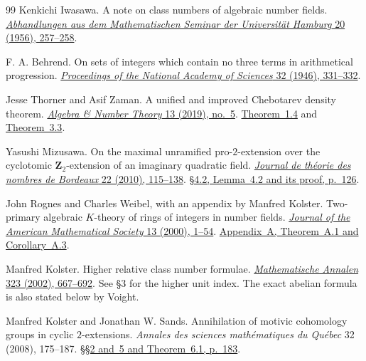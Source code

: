 \begin{thebibliography}{99}
Kenkichi Iwasawa.
A note on class numbers of algebraic number fields.
\href{https://link.springer.com/article/10.1007/BF03374563}
{\emph{Abhandlungen aus dem Mathematischen Seminar der Universit\"at
Hamburg} 20 (1956), 257--258}.

F. A. Behrend.
On sets of integers which contain no three terms in arithmetical progression.
\href{https://doi.org/10.1073/pnas.32.12.331}
{\emph{Proceedings of the National Academy of Sciences} 32 (1946), 331--332}.

Jesse Thorner and Asif Zaman.
A unified and improved Chebotarev density theorem.
\href{https://doi.org/10.2140/ant.2019.13.1039}
{\emph{Algebra \& Number Theory} 13 (2019), no.~5}.
\href{https://msp.org/ant/2019/13-5/ant-v13-n5-p02-s.pdf\#page=5}
{Theorem~1.4} and
\href{https://msp.org/ant/2019/13-5/ant-v13-n5-p02-s.pdf\#page=15}
{Theorem~3.3}.

Yasushi Mizusawa.
On the maximal unramified pro-\(2\)-extension over the cyclotomic
\(\mathbf Z_2\)-extension of an imaginary quadratic field.
\href{https://doi.org/10.5802/jtnb.707}{\emph{Journal de th\'eorie des nombres de Bordeaux}
22 (2010), 115--138}.
\href{https://www.numdam.org/item/JTNB_2010__22_1_115_0.pdf\#page=13}
{\S4.2, Lemma~4.2 and its proof, p.~126}.

John Rognes and Charles Weibel, with an appendix by Manfred Kolster.
Two-primary algebraic \(K\)-theory of rings of integers in number fields.
\href{https://doi.org/10.1090/S0894-0347-99-00317-3}
{\emph{Journal of the American Mathematical Society} 13 (2000), 1--54}.
\href{https://sites.math.rutgers.edu/~weibel/archive/papers-dir/RognesWeibel.pdf\#page=45}
{Appendix~A, Theorem~A.1 and Corollary~A.3}.

Manfred Kolster. Higher relative class number formulae.
\href{https://doi.org/10.1007/s002080200321}
{\emph{Mathematische Annalen} 323 (2002), 667--692}.
See \S3 for the higher unit index. The exact abelian formula is also stated below by Voight.

Manfred Kolster and Jonathan W. Sands.
Annihilation of motivic cohomology groups in cyclic \(2\)-extensions.
\emph{Annales des sciences math\'ematiques du Qu\'ebec} 32 (2008), 175--187.
\href{https://www.labmath.uqam.ca/~annales/volumes/32-2/PDF/175-187.pdf\#page=9}
{\S\S2 and~5 and Theorem~6.1, p.~183}.


\end{thebibliography}

